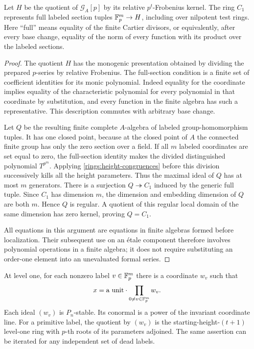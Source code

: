 \begin{lemma}
\label{rings:full-sections-presentation}
Let $H$ be the quotient of $\mathcal G_A[p]$ by its relative
$p^t$-Frobenius kernel.  The ring $C_1$ represents full labeled
section tuples $\mathbb F_p^m\to H$, including over nilpotent test
rings.  Here ``full'' means equality of the finite Cartier
divisors, or equivalently, after every base change,
equality of the norm of every function with its product
over the labeled sections.
\end{lemma}

\begin{proof}
The quotient $H$ has the monogenic presentation obtained by
dividing the prepared $p$-series by relative Frobenius.  The
full-section condition is a finite set of coefficient
identities for its monic polynomial.  Indeed equality for the
coordinate implies equality of the characteristic polynomial
for every polynomial in that coordinate by substitution, and
every function in the finite algebra has such a representative.
This description commutes with arbitrary base change.

Let $Q$ be the resulting finite complete $A$-algebra of labeled
group-homomorphism tuples.  It has one closed point, because
at the closed point of $A$ the connected finite group has only
the zero section over a field.  If all $m$ labeled coordinates
are set equal to zero, the full-section identity makes the
divided distinguished polynomial $T^{p^m}$.  Applying
\eqref{rings:height-congruences} before this division
successively kills all the height parameters.  Thus the
maximal ideal of $Q$ has at most $m$ generators.  There is a
surjection $Q\twoheadrightarrow C_1$ induced by the generic
full tuple.  Since $C_1$ has dimension $m$, the dimension and
embedding dimension of $Q$ are both $m$.  Hence $Q$ is regular.
A quotient of this regular local domain of the same dimension
has zero kernel, proving $Q=C_1$.

All equations in this argument are equations in finite
algebras formed before localization.  Their subsequent use
on an \'etale component therefore involves polynomial
operations in a finite algebra; it does not require substituting
an order-one element into an unevaluated formal series.
\end{proof}

\begin{corollary}
\label{rings:boundary-labels}
At level one, for each nonzero label $v\in\mathbb F_p^m$ there is a
coordinate $w_v$ such that
\begin{equation}\label{rings:height-divisor}
 x=\text{a unit}\cdot\prod_{0\ne v\in\mathbb F_p^m}w_v.
\end{equation}
Each ideal $(w_v)$ is $P_n$-stable.  Its conormal is a power of the
invariant coordinate line.  For a primitive label, the quotient by
$(w_v)$ is the starting-height-$(t+1)$ level-one ring with $p$-th
roots of its parameters adjoined.  The same assertion can be
iterated for any independent set of dead labels.
\end{corollary}

